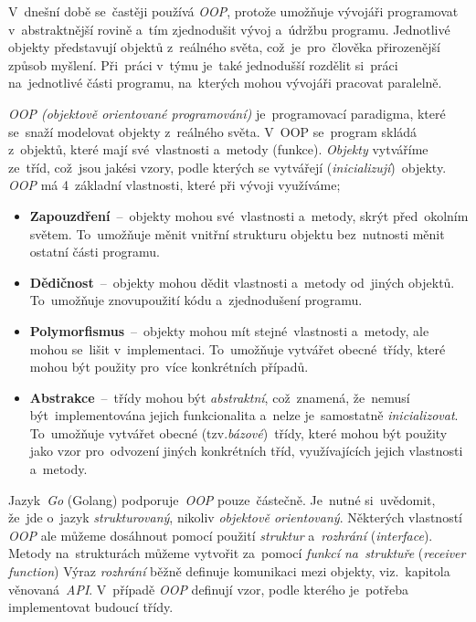 \documentclass[10pt,a4paper]{article}
\begin{document}
        V~dnešní době se~častěji používá \emph{OOP}, protože umožňuje vývojáři programovat v~abstraktnější rovině a~tím zjednodušit vývoj a~údržbu programu. Jednotlivé objekty představují  objektů z~reálného světa, což~je~pro~člověka přirozenější způsob myšlení. Při~práci v~týmu je~také jednodušší rozdělit si~práci na~jednotlivé části programu, na~kterých mohou vývojáři pracovat paralelně.
        
        \emph{OOP (objektově orientované programování)} je~programovací paradigma, které se~snaží modelovat objekty z~reálného světa. V~OOP se~program skládá z~objektů, které mají své~vlastnosti a~metody (funkce). \emph{Objekty} vytváříme ze~tříd, což~jsou jakési vzory, podle kterých se vytvářejí (\emph{inicializují})~objekty. \emph{OOP} má 4~základní vlastnosti, které při vývoji využíváme; \cite{Keogh:OOP}
        \begin{itemize}
            \item \textbf{Zapouzdření}~--~objekty mohou své~vlastnosti a~metody, skrýt před~okolním světem. To~umožňuje měnit vnitřní strukturu objektu bez~nutnosti měnit ostatní části programu.
            \item \textbf{Dědičnost}~--~objekty mohou dědit vlastnosti a~metody od~jiných objektů. To~umožňuje znovupoužití kódu a~zjednodušení programu.
            \item \textbf{Polymorfismus}~--~objekty mohou mít stejné~vlastnosti a~metody, ale mohou se~lišit v~implementaci. To~umožňuje vytvářet obecné~třídy, které mohou být použity pro~více konkrétních případů.
            \item \textbf{Abstrakce}~--~třídy mohou být \emph{abstraktní}, což~znamená, že~nemusí být~implementována jejich funkcionalita a~nelze je~samostatně \emph{inicializovat}. To~umožňuje vytvářet obecné (tzv.\emph{bázové})~třídy, které mohou být použity jako vzor pro~odvození jiných konkrétních tříd, využívajících jejich vlastnosti a~metody.
        \end{itemize}

        Jazyk~\emph{Go} (Golang) podporuje~\emph{OOP} pouze~částečně. Je~nutné si~uvědomit, že~jde o~jazyk \emph{strukturovaný}, nikoliv \emph{objektově orientovaný}. Některých vlastností \emph{OOP} ale můžeme dosáhnout pomocí použití \emph{struktur} a~\emph{rozhrání} (\emph{interface}). Metody na~strukturách můžeme vytvořit za~pomocí \emph{funkcí na~struktuře} (\emph{receiver function})
        Výraz \emph{rozhrání} běžně definuje komunikaci mezi objekty, viz.~kapitola věnovaná~\emph{API}. V~případě \emph{OOP} definují vzor, podle kterého je~potřeba implementovat budoucí třídy. \cite{go:OOP}
        
\end{document}
